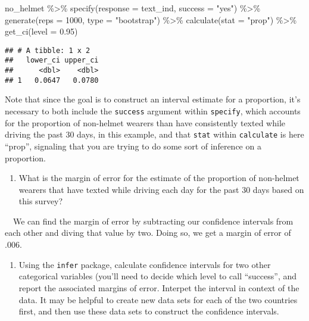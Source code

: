 \documentclass[
]{article}
\newenvironment{Shaded}{\begin{snugshade}}{\end{snugshade}}
\newcommand{\AttributeTok}[1]{\textcolor[rgb]{0.77,0.63,0.00}{#1}}
\newcommand{\DecValTok}[1]{\textcolor[rgb]{0.00,0.00,0.81}{#1}}
\newcommand{\FloatTok}[1]{\textcolor[rgb]{0.00,0.00,0.81}{#1}}
\newcommand{\FunctionTok}[1]{\textcolor[rgb]{0.00,0.00,0.00}{#1}}
\newcommand{\NormalTok}[1]{#1}
\newcommand{\SpecialCharTok}[1]{\textcolor[rgb]{0.00,0.00,0.00}{#1}}
\newcommand{\StringTok}[1]{\textcolor[rgb]{0.31,0.60,0.02}{#1}}
\providecommand{\tightlist}{%
  \setlength{\itemsep}{0pt}\setlength{\parskip}{0pt}}
\begin{document}
\begin{Shaded}
\begin{Highlighting}[]
\NormalTok{no\_helmet }\SpecialCharTok{\%\textgreater{}\%}
  \FunctionTok{specify}\NormalTok{(}\AttributeTok{response =}\NormalTok{ text\_ind, }\AttributeTok{success =} \StringTok{"yes"}\NormalTok{) }\SpecialCharTok{\%\textgreater{}\%}
  \FunctionTok{generate}\NormalTok{(}\AttributeTok{reps =} \DecValTok{1000}\NormalTok{, }\AttributeTok{type =} \StringTok{"bootstrap"}\NormalTok{) }\SpecialCharTok{\%\textgreater{}\%}
  \FunctionTok{calculate}\NormalTok{(}\AttributeTok{stat =} \StringTok{"prop"}\NormalTok{) }\SpecialCharTok{\%\textgreater{}\%}
  \FunctionTok{get\_ci}\NormalTok{(}\AttributeTok{level =} \FloatTok{0.95}\NormalTok{)}
\end{Highlighting}
\end{Shaded}

\begin{verbatim}
## # A tibble: 1 x 2
##   lower_ci upper_ci
##      <dbl>    <dbl>
## 1   0.0647   0.0780
\end{verbatim}

Note that since the goal is to construct an interval estimate for a
proportion, it's necessary to both include the \texttt{success} argument
within \texttt{specify}, which accounts for the proportion of non-helmet
wearers than have consistently texted while driving the past 30 days, in
this example, and that \texttt{stat} within \texttt{calculate} is here
``prop'', signaling that you are trying to do some sort of inference on
a proportion.

\begin{enumerate}
\def\labelenumi{\arabic{enumi}.}
\setcounter{enumi}{2}
\tightlist
\item
  What is the margin of error for the estimate of the proportion of
  non-helmet wearers that have texted while driving each day for the
  past 30 days based on this survey?
\end{enumerate}

~~We can find the margin of error by subtracting our confidence
intervals from each other and diving that value by two. Doing so, we get
a margin of error of .006.

\begin{enumerate}
\def\labelenumi{\arabic{enumi}.}
\setcounter{enumi}{3}
\tightlist
\item
  Using the \texttt{infer} package, calculate confidence intervals for
  two other categorical variables (you'll need to decide which level to
  call ``success'', and report the associated margins of error. Interpet
  the interval in context of the data. It may be helpful to create new
  data sets for each of the two countries first, and then use these data
  sets to construct the confidence intervals.
\end{enumerate}
\end{document}
